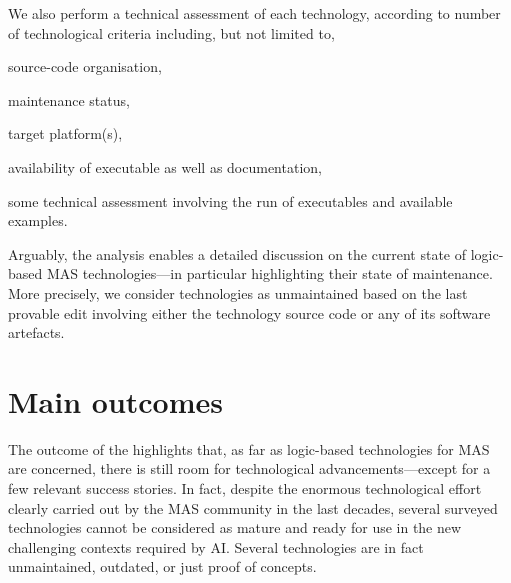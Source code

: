 \documentclass[12pt,a4paper,openright,twoside]{book}
\begin{document}
We also perform a technical assessment of each technology, according to number of technological criteria including, but not limited to,
%
\begin{inlinelist}
    \item source-code organisation,
    \item maintenance status,
    \item target platform(s),
    \item availability of executable as well as documentation,
    \item some technical assessment involving the run of executables and available examples.
\end{inlinelist}
%
Arguably, the analysis enables a detailed discussion on the current state of logic-based MAS technologies---in particular highlighting their state of maintenance.
%
More precisely, we consider technologies as unmaintained based on the last provable edit involving either the technology source code or any of its software artefacts\footnotemark.
%

\section{Main outcomes}\label{sec:outcomes}

The outcome of the \slr{} highlights that, as far as logic-based technologies for MAS are concerned, there is still room for technological advancements---except for a few relevant success stories.
%
In fact, despite the enormous technological effort clearly carried out by the MAS community in the last decades, several surveyed technologies cannot be considered as mature and ready for use in the new challenging contexts required by AI.
%
Several technologies are in fact unmaintained, outdated, or just proof of concepts.
\end{document}
